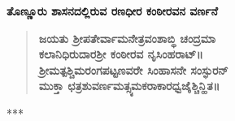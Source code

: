 \noindent
\textbf{ತೊಣ್ಣೂರು ಶಾಸನದಲ್ಲಿರುವ ರಣಧೀರ ಕಂಠೀರವನ ವರ್ಣನೆ}

\begin{verse}
\textbf{ಜಯತು ಶ‍್ರೀಪತೇರ್ವಾಮನೇತ್ರವಂಶಾಬ್ಧಿ ಚಂದ್ರಮಾ \\ ಕಲಾನಿಧಿರುದಾರಶ‍್ರೀ ಕಂಠೀರವ ನೃಸಿಂಹರಾಟ್​॥ \\ ಶ‍್ರೀಮತ್ಪಶ್ಚಿಮರಂಗಪಟ್ಟಣವರೇ ಸಿಂಹಾಸನೇ ಸಂಸ್ಫುರನ್​ \\ ಮುಕ್ತಾ ಛತ್ರಶುವರ್ಣಮತ್ಸ್ಯಮಕರಾಕಾರಧ್ವಜೈಶ್ಚಿನ್ಹಿತ॥}
\end{verse}

\begin{center}
***
\end{center}

\theendnotes

